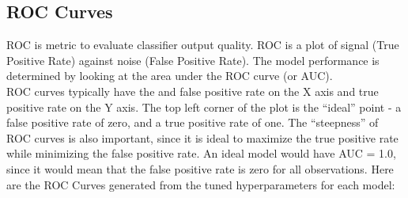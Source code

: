 \documentclass[fleqn]{article}
\begin{document}
    \subsection{ROC Curves}
    ROC is metric to evaluate classifier output quality. ROC is a plot of signal (True
    Positive Rate) against noise (False Positive Rate). The model performance is
    determined by looking at the area under the ROC curve (or AUC).\\

    ROC curves typically have the and false positive rate on the X axis and true positive
    rate on the Y axis. The top left corner of the plot is the “ideal” point - a false
    positive rate of zero, and a true positive rate of one. The “steepness” of ROC curves
    is also important, since it is ideal to maximize the true positive rate while
    minimizing the false positive rate. An ideal model would have AUC = 1.0, since it would
    mean that the false positive rate is zero for all observations. Here are the ROC
    Curves generated from the tuned hyperparameters for each model:
\end{document}
